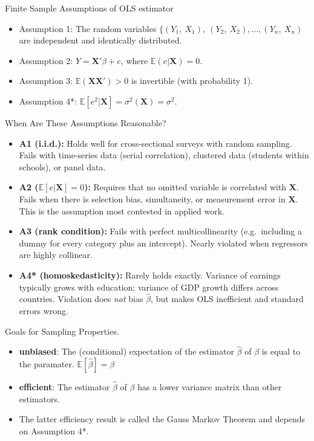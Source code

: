 \documentclass[aspectratio=169, handout]{beamer}
\numberwithin{equation}{section}
\begin{document}
\begin{frame}{Finite Sample Assumptions of OLS estimator}
\begin{itemize}
\item Assumption 1: The random variables $\{(Y_1,\ X_1),\ (Y_2,\ X_2), \ldots, (Y_n,\ X_n)$ are independent and identically distributed.
\item Assumption 2: $Y=\bm{X}'\beta+e$, where $\mathbb{E}(e|\bm{X})=0$. 
\item Assumption 3: $\mathbb{E}(\bm{X}\bm{X}')>0$ is invertible (with probability 1).
\item Assumption 4*: $\mathbb{E}[e^2|\bm{X}]=\sigma^2(\bm{X})=\sigma^2$. 
\end{itemize}
\end{frame}

\begin{frame}{When Are These Assumptions Reasonable?}
\begin{itemize}
\item \textbf{A1 (i.i.d.):} Holds well for cross-sectional surveys with random sampling. Fails with time-series data (serial correlation), clustered data (students within schools), or panel data.\pause
\item \textbf{A2 ($\mathbb{E}[e|\bm{X}]=0$):} Requires that no omitted variable is correlated with $\bm{X}$. Fails when there is selection bias, simultaneity, or measurement error in $\bm{X}$. This is the assumption most contested in applied work.\pause
\item \textbf{A3 (rank condition):} Fails with perfect multicollinearity (e.g.\ including a dummy for every category plus an intercept). Nearly violated when regressors are highly collinear.\pause
\item \textbf{A4* (homoskedasticity):} Rarely holds exactly. Variance of earnings typically grows with education; variance of GDP growth differs across countries. Violation does \emph{not} bias $\hat{\beta}$, but makes OLS inefficient and standard errors wrong.
\end{itemize}
\end{frame}

\begin{frame}{Goals for Sampling Properties.}
\begin{itemize}
\item \textbf{unbiased}: The (conditional) expectation of the estimator $\hat{\beta}$ of $\beta$ is equal to the paramater.  $\mathbb{E}[\hat{\beta}]=\beta$
\item \textbf{efficient}: The estimator $\hat{\beta}$ of $\beta$ has a lower variance matrix than other estimators.
\item The latter efficiency result is called the Gauss Markov Theorem and depends on Assumption 4*.
\end{itemize}
\end{frame}
\end{document}
